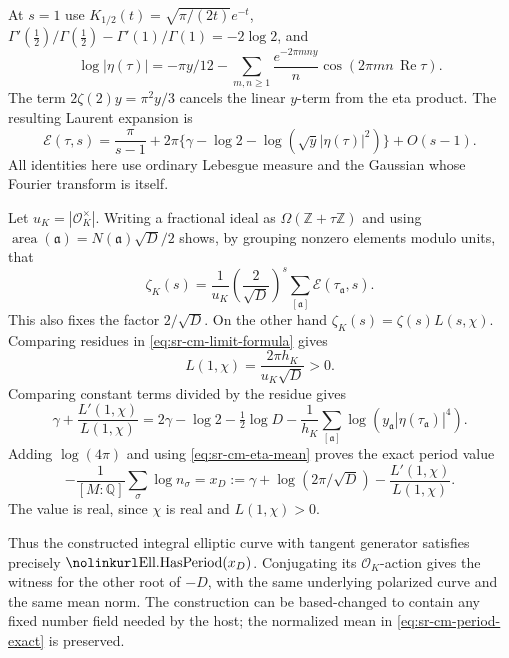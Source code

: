 At \(s=1\) use
\(K_{1/2}(t)=\sqrt{\pi/(2t)}e^{-t}\),
\(\Gamma'(\tfrac12)/\Gamma(\tfrac12)
-\Gamma'(1)/\Gamma(1)=-2\log2\),
and
\[
 \log|\eta(\tau)|
     =-\pi y/12-
         \sum_{m,n\ge1}\frac{e^{-2\pi mn y}}n
                       \cos(2\pi mn\,\operatorname{Re}\tau).
\]
The term \(2\zeta(2)y=\pi^2y/3\) cancels the
linear \(y\)-term from the eta product.
The resulting Laurent expansion is
\begin{equation}\label{eq:sr-cm-limit-formula}
 \mathcal E(\tau,s)
       =\frac{\pi}{s-1}
           +2\pi\{\gamma-\log2-
                         \log(\sqrt y|\eta(\tau)|^2)\}
           +O(s-1).
\end{equation}
All identities here use ordinary Lebesgue measure and
the Gaussian whose Fourier transform is itself.

Let \(u_K=|\mathcal O_K^\times|\).
Writing a fractional ideal as
\(\Omega(\mathbb Z+\tau\mathbb Z)\) and using
\(\operatorname{area}(\mathfrak a)
   =N(\mathfrak a)\sqrt D/2\)
shows, by grouping nonzero elements modulo units, that
\[
 \zeta_K(s)=\frac1{u_K}
           \left(\frac2{\sqrt D}\right)^s
                         \sum_{[\mathfrak a]}
                                     \mathcal E(\tau_\mathfrak a,s).
\]
This also fixes the factor \(2/\sqrt D\).
On the other hand \(\zeta_K(s)=\zeta(s)L(s,\chi)\).
Comparing residues in
\eqref{eq:sr-cm-limit-formula} gives
\[
                     L(1,\chi)=
                        \frac{2\pi h_K}{u_K\sqrt D}>0 .
\]
Comparing constant terms divided by the residue gives
\[
 \gamma+\frac{L'(1,\chi)}{L(1,\chi)}
    =2\gamma-\log2-\tfrac12\log D
       -\frac1{h_K}\sum_{[\mathfrak a]}
                   \log\!\left(y_\mathfrak a
                                  |\eta(\tau_\mathfrak a)|^4\right).
\]
Adding \(\log(4\pi)\) and using
\eqref{eq:sr-cm-eta-mean} proves the exact period value
\begin{equation}\label{eq:sr-cm-period-exact}
 -\frac1{[M:\mathbb Q]}\sum_\sigma\log n_\sigma
       =x_D
       :=\gamma+\log(2\pi/\sqrt D)
                            -\frac{L'(1,\chi)}{L(1,\chi)} .
\end{equation}
The value is real, since \(\chi\) is real and
\(L(1,\chi)>0\).

Thus the constructed integral elliptic curve with
tangent generator satisfies precisely
\(\srcid{Ell.HasPeriod}(x_D)\).
Conjugating its \(\mathcal O_K\)-action gives the witness
for the other root of \(-D\), with the same underlying
polarized curve and the same mean norm.
The construction can be based-changed to contain any
fixed number field needed by the host; the normalized
mean in \eqref{eq:sr-cm-period-exact} is preserved.

